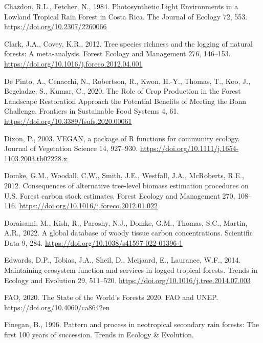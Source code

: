 \documentclass[
  12pt,
]{article}
\newlength{\cslhangindent}
\newlength{\cslentryspacingunit} %
\newenvironment{CSLReferences}[2] %
 {%
  \setlength{\parindent}{0pt}
  \ifodd #1
  \let\oldpar\par
  \def\par{\hangindent=\cslhangindent\oldpar}
  \fi
  \setlength{\parskip}{#2\cslentryspacingunit}
 }%
 {}
\begin{document}
\begin{CSLReferences}{1}{0}
\leavevmode{}%
Chazdon, R.L., Fetcher, N., 1984. Photosynthetic {Light Environments} in a {Lowland Tropical Rain Forest} in {Costa Rica}. The Journal of Ecology 72, 553. \url{https://doi.org/10.2307/2260066}

\leavevmode{}%
Clark, J.A., Covey, K.R., 2012. Tree species richness and the logging of natural forests: {A} meta-analysis. Forest Ecology and Management 276, 146--153. \url{https://doi.org/10.1016/j.foreco.2012.04.001}

\leavevmode{}%
De Pinto, A., Cenacchi, N., Robertson, R., Kwon, H.-Y., Thomas, T., Koo, J., Begeladze, S., Kumar, C., 2020. The {Role} of {Crop Production} in the {Forest Landscape Restoration Approach} the {Potential Benefits} of {Meeting} the {Bonn Challenge}. Frontiers in Sustainable Food Systems 4, 61. \url{https://doi.org/10.3389/fsufs.2020.00061}

\leavevmode{}%
Dixon, P., 2003. {VEGAN}, a package of {R} functions for community ecology. Journal of Vegetation Science 14, 927--930. \url{https://doi.org/10.1111/j.1654-1103.2003.tb02228.x}

\leavevmode{}%
Domke, G.M., Woodall, C.W., Smith, J.E., Westfall, J.A., McRoberts, R.E., 2012. Consequences of alternative tree-level biomass estimation procedures on {U}.{S}. Forest carbon stock estimates. Forest Ecology and Management 270, 108--116. \url{https://doi.org/10.1016/j.foreco.2012.01.022}

\leavevmode{}%
Doraisami, M., Kish, R., Paroshy, N.J., Domke, G.M., Thomas, S.C., Martin, A.R., 2022. A global database of woody tissue carbon concentrations. Scientific Data 9, 284. \url{https://doi.org/10.1038/s41597-022-01396-1}

\leavevmode{}%
Edwards, D.P., Tobias, J.A., Sheil, D., Meijaard, E., Laurance, W.F., 2014. Maintaining ecosystem function and services in logged tropical forests. Trends in Ecology and Evolution 29, 511--520. \url{https://doi.org/10.1016/j.tree.2014.07.003}

\leavevmode{}%
FAO, 2020. The {State} of the {World}'s {Forests} 2020. {FAO and UNEP}. \url{https://doi.org/10.4060/ca8642en}

\leavevmode{}%
Finegan, B., 1996. Pattern and process in neotropical secondary rain forests: The first 100 years of succession. Trends in Ecology \& Evolution.


\end{CSLReferences}
\end{document}
